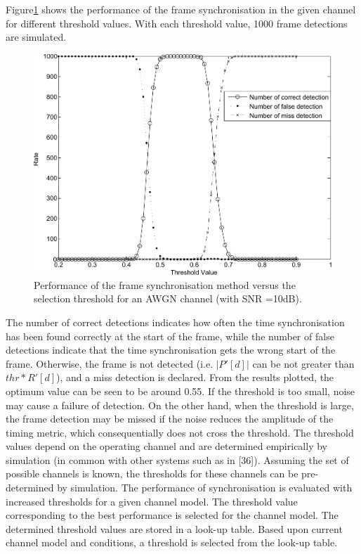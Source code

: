 Figure\ref{fig:TimeSyn_thr_AWGN} shows the performance of the frame synchronisation in the given channel for different threshold values.
With each threshold value, 1000 frame detections are simulated.
\begin{figure}
	\centerline{\includegraphics [width=0.9\columnwidth] {figures/ThresholdEffect.pdf}}
	\caption{Performance of the frame synchronisation method versus the selection threshold for an AWGN channel (with SNR =10dB).}
	\label{fig:TimeSyn_thr_AWGN}
\end{figure}
The number of correct detections indicates how often the time synchronisation has been found correctly at the start of the frame, while the number of false detections indicate that the time synchronisation gets the wrong start of the frame.
Otherwise, the frame is not detected (i.e. $|P'[d]|$ can be not greater than $thr * R'[d]$), and a miss detection is declared.
From the results plotted,  the optimum value can be seen to be around 0.55.
If the threshold is too small, noise may cause a failure of detection.
On the other hand, when the threshold is large, the frame detection may be missed if the noise reduces the amplitude of the timing metric, which consequentially does not cross the threshold.
The threshold values depend on the operating channel and are determined empirically by simulation (in common with other systems such as in [36]). Assuming the set of possible channels is known, the thresholds for these channels can be pre-determined by simulation. The performance of synchronisation is evaluated with increased thresholds for a given channel model. The threshold value corresponding to the best performance is selected for the channel model. The determined threshold values are stored in a look-up table. Based upon current channel model and conditions, a threshold is selected from the look-up table.




